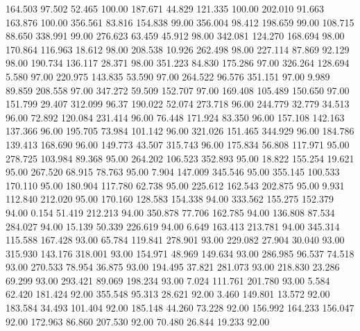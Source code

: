  164.503   97.502   52.465       100.00
 187.671   44.829  121.335       100.00
 202.010   91.663  163.876       100.00
 356.561   83.816  154.838        99.00
 356.004   98.412  198.659        99.00
 108.715   88.650  338.991        99.00
 276.623   63.459   45.912        98.00
 342.081  124.270  168.694        98.00
 170.864  116.963   18.612        98.00
 208.538   10.926  262.498        98.00
 227.114   87.869   92.129        98.00
 190.734  136.117   28.371        98.00
 351.223   84.830  175.286        97.00
 326.264  128.694    5.580        97.00
 220.975  143.835   53.590        97.00
 264.522   96.576  351.151        97.00
   9.989   89.859  208.558        97.00
 347.272   59.509  152.707        97.00
 169.408  105.489  150.650        97.00
 151.799   29.407  312.099        96.37
 190.022   52.074  273.718        96.00
 244.779   32.779   34.513        96.00
  72.892  120.084  231.414        96.00
  76.448  171.924   83.350        96.00
 157.108  142.163  137.366        96.00
 195.705   73.984  101.142        96.00
 321.026  151.465  344.929        96.00
 184.786  139.413  168.690        96.00
 149.773   43.507  315.743        96.00
 175.834   56.808  117.971        95.00
 278.725  103.984   89.368        95.00
 264.202  106.523  352.893        95.00
  18.822  155.254   19.621        95.00
 267.520   68.915   78.763        95.00
   7.904  147.009  345.546        95.00
 355.145  100.533  170.110        95.00
 180.904  117.780   62.738        95.00
 225.612  162.543  202.875        95.00
   9.931  112.840  212.020        95.00
 170.160  128.583  154.338        94.00
 333.562  155.275  152.379        94.00
   0.154   51.419  212.213        94.00
 350.878   77.706  162.785        94.00
 136.808   87.534  284.027        94.00
  15.139   50.339  226.619        94.00
   6.649  163.413  213.781        94.00
 345.314  115.588  167.428        93.00
  65.784  119.841  278.901        93.00
 229.082   27.904   30.040        93.00
 315.930  143.176  318.001        93.00
 154.971   48.969  149.634        93.00
 286.985   96.537   74.518        93.00
 270.533   78.954   36.875        93.00
 194.495   37.821  281.073        93.00
 218.830   23.286   69.299        93.00
 293.421   89.069  198.234        93.00
   7.024  111.761  201.780        93.00
   5.584   62.420  181.424        92.00
 355.548   95.313   28.621        92.00
   3.460  149.801   13.572        92.00
 183.584   34.493  101.404        92.00
 185.148   44.260   73.228        92.00
 156.992  164.233  156.047        92.00
 172.963   86.860  207.530        92.00
  70.480   26.844   19.233        92.00
